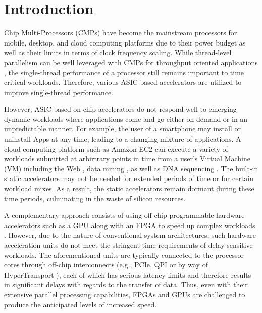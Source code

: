 
\section{Introduction}


Chip Multi-Processors (CMPs) have become the mainstream processors for
mobile, desktop, and cloud computing platforms due to their power
budget as well as their limits in terms of clock frequency scaling. While
thread-level parallelism can be well leveraged with CMPs
for throughput oriented applications \cite{CMP05}, the single-thread performance of
a processor still remains important to time critical workloads. Therefore,
various ASIC-based accelerators are utilized to improve single-thread performance. 

However, ASIC based on-chip accelerators do not respond well to
emerging dynamic workloads where applications come and go either on
demand or in an unpredictable manner. For example, the user of a smartphone may
install or uninstall Apps at any time, leading to a changing mixture
of applications. A cloud computing platform such as Amazon EC2
\cite{amazon-ec2} can execute a variety of workloads submitted at arbirtrary points in time from a user's Virtual Machine (VM) 
 including the Web \cite{Chen:2012jo}, data mining \cite{ec2-datamining}, as well as DNA sequencing
\cite{ec2-dna}.  The built-in static accelerators may not be needed for extended periods of time
or for certain workload mixes.  As a result, the static accelerators remain dormant during these time periods, 
culminating in the waste of silicon resources.

A complementary approach consists of using off-chip programmable hardware
accelerators such as a GPU along with an FPGA to speed up complex workloads
\cite{GPUFPGA, fpga-acc}. However, due to the nature of conventional system architectures, 
such hardware acceleration units do not meet the stringent time requirements 
of delay-sensitive workloads. The aforementioned units are typically
connected to the processor cores through off-chip interconnects
(e.g., PCIe, QPI \cite{intel-qpi} or by way of HyperTransport
\cite{amd-hypertransport}), each of which has serious latency limits and therefore results in
significant delays with regards to the transfer of data. Thus, even with their extensive
parallel processing capabilities, FPGAs and GPUs are challenged to produce the anticipated levels
of increased speed.  

